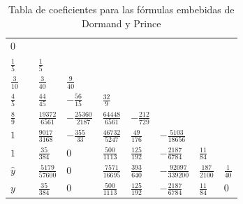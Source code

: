 \begin{table}[h]
	\caption{Tabla de coeficientes para las fórmulas embebidas de Dormand y Prince} \label{ButcherTabla}
	\begin{center}
		\begin{tabular}{ l@{\vrule height 5pt depth 10pt width 0pt}|lllllll}
			$0$ & \\
			$\frac{1}{5}\quad$ & $\frac{1}{5}$ \\
			$\frac{3}{10}\quad$ & $\frac{3}{40}$ & $\frac{9}{40}$ \\
			$\frac{4}{5}\quad$ & $\frac{44}{45}$ & $-\frac{56}{15}$ & $\frac{32}{9}$ \\
			$\frac{8}{9}\quad$ & $\frac{19372}{6561}$ & $-\frac{25360}{2187}$ & $\frac{64448}{6561}$ & $-\frac{212}{729}$ \\
			$1\quad$ & $\frac{9017}{3168}$ & $-\frac{355}{33}$ & $\frac{46732}{5247}$ & $\frac{49}{176}$
			& $-\frac{5103}{18656}$ \\
			$1\quad$ & $\frac{35}{384}$ & $0$ & $\frac{500}{1113}$ & $\frac{125}{192}$
			& $-\frac{2187}{6784}$ & $\frac{11}{84}$ \\
			\hline
			$\widehat{y}$ & $\frac{5179}{57600}$ & $0$ & $\frac{7571}{16695}$ & $\frac{393}{640}$
			& $-\frac{92097}{339200}$ & $\frac{187}{2100}$ & $\frac{1}{40}$
			\rule[-0.3cm]{0cm}{0.8cm} \\
			$y$ & $\frac{35}{384}$ & $0$ & $\frac{500}{1113}$ & $\frac{125}{192}$
			& $-\frac{2187}{6784}$ & $\frac{11}{84}$ & $0$
		\end{tabular}
	\end{center}
\end{table}


